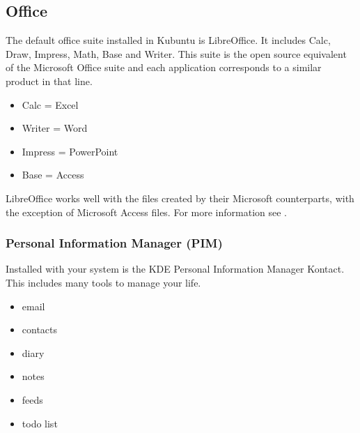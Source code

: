 \documentclass[letterpaper,10pt,english]{sphinxmanual}
\begin{document}
\subsection{Office}
\label{\detokenize{docs/software-management/software:office}}
\sphinxAtStartPar
The default office suite installed in Kubuntu is LibreOffice. It includes Calc, Draw, Impress, Math, Base and Writer. This suite is the open source equivalent of the Microsoft Office suite and each application corresponds to a similar product in that line.
\begin{itemize}
\item {} 
\sphinxAtStartPar
Calc = Excel

\item {} 
\sphinxAtStartPar
Writer = Word

\item {} 
\sphinxAtStartPar
Impress = PowerPoint

\item {} 
\sphinxAtStartPar
Base = Access

\end{itemize}

\sphinxAtStartPar
LibreOffice works well with the files created by their Microsoft counterparts, with the exception of Microsoft Access files. For more information see .


\subsubsection{Personal Information Manager (PIM)}
\label{\detokenize{docs/software-management/software:personal-information-manager-pim}}
\sphinxAtStartPar
Installed with your system is the KDE Personal Information Manager Kontact. This includes many tools to manage your life.
\begin{itemize}
\item {} 
\sphinxAtStartPar
email

\item {} 
\sphinxAtStartPar
contacts

\item {} 
\sphinxAtStartPar
diary

\item {} 
\sphinxAtStartPar
notes

\item {} 
\sphinxAtStartPar
feeds

\item {} 
\sphinxAtStartPar
to\sphinxhyphen{}do list

\end{itemize}
\end{document}
